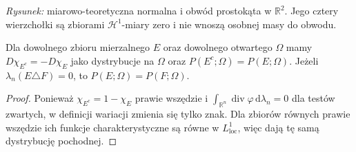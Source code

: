\begin{center}
\end{center}
\noindent\emph{Rysunek:} miarowo-teoretyczna normalna i obwód
prostokąta w $\mathbb R^2$. Jego cztery wierzchołki
są zbiorami $\mathcal H^1$-miary zero i nie wnoszą
osobnej masy do obwodu.

\begin{lemat}
\label{lem:perimeter-complement-29}
Dla dowolnego zbioru mierzalnego $E$ oraz dowolnego
otwartego $\Omega$ mamy
$D\chi_{E^c}=-D\chi_E$ jako dystrybucje na $\Omega$
oraz $P(E^c;\Omega)=P(E;\Omega)$.
Jeżeli $\lambda_n(E\triangle F)=0$,
to $P(E;\Omega)=P(F;\Omega)$.
\end{lemat}
\begin{proof}
Ponieważ $\chi_{E^c}=1-\chi_E$ prawie wszędzie
i $\int_{\mathbb R^n}\operatorname{div}\varphi
\,\mathrm d\lambda_n=0$ dla testów zwartych,
w definicji wariacji zmienia się tylko znak.
Dla zbiorów równych prawie wszędzie ich funkcje
charakterystyczne są równe w $L^1_{\mathrm{loc}}$,
więc dają tę samą dystrybucję pochodnej.
\end{proof}

